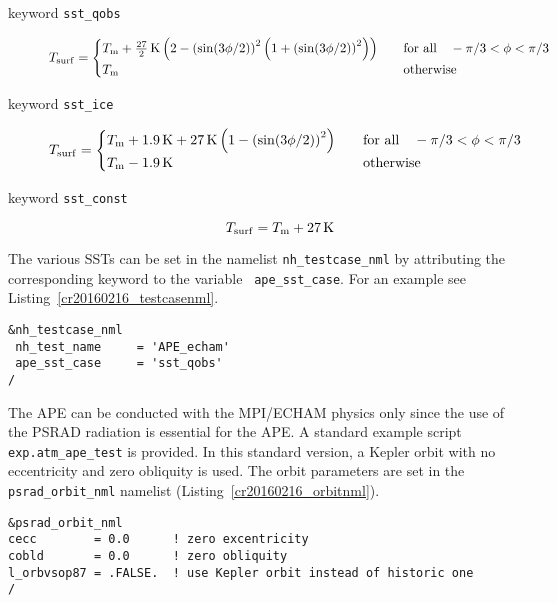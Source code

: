 \begin{description}
\item[keyword {\tt sst\_qobs}]
\begin{equation}
T_{\rm surf}=
\begin{cases}
T_{\rm m} + \frac{27}{2}\,{\rm K} \left(2-\left(\sin(3\phi/2)\right)^2
\left(1+\left(\sin(3\phi/2)\right)^2
\right)\right)
&\quad \text{for all} \quad -\pi/3<\phi<\pi/3\\
T_{\rm m} &\quad \text{otherwise}
\end{cases}
\end{equation}
\item[keyword {\tt sst\_ice}]
\begin{equation}
T_{\rm surf}=
\begin{cases}
T_{\rm m} + 1.9\,{\rm K} + 27\,{\rm K} \left(1-\left(\sin(3\phi/2)\right)^2\right)
&\quad \text{for all} \quad -\pi/3<\phi<\pi/3\\
T_{\rm m}-1.9\,{\rm K} &\quad \text{otherwise}
\end{cases}
\end{equation}
\item[keyword {\tt sst\_const}]
\begin{equation}
T_{\rm surf}=T_{\rm m}+27\,{\rm K}
\end{equation}
 
\end{description}

The various SSTs can be set in the namelist {\tt nh\_testcase\_nml} by
attributing the corresponding keyword to the variable {\tt
  ape\_sst\_case}. For an example see Listing~\ref{cr20160216_testcasenml}.

\begin{lstlisting}[caption=Testcase namelist for APE ({\tt
    exp.atm\_ape\_test}), label=cr20160216_testcasenml]
&nh_testcase_nml
 nh_test_name     = 'APE_echam'
 ape_sst_case     = 'sst_qobs'
/
\end{lstlisting}

The
APE can be conducted with the MPI/ECHAM physics only since 
the use of the PSRAD radiation is essential for the APE. A standard
example script {\tt exp.atm\_ape\_test} is provided.
In this standard version, a Kepler orbit with no eccentricity and
zero obliquity is used. The orbit parameters are set in the {\tt
  psrad\_orbit\_nml} namelist (Listing~\ref{cr20160216_orbitnml}).

\begin{lstlisting}[caption=Orbit namelist for APE ({\tt exp.atm\_ape\_test}),
label=cr20160216_orbitnml]
&psrad_orbit_nml
cecc        = 0.0      ! zero excentricity
cobld       = 0.0      ! zero obliquity
l_orbvsop87 = .FALSE.  ! use Kepler orbit instead of historic one
/
\end{lstlisting}

